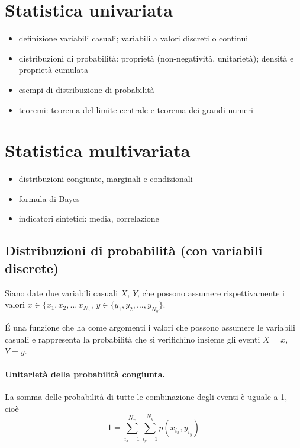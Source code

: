 
\section{Statistica univariata}
% 

\begin{itemize}
  \item definizione variabili casuali; variabili a valori discreti o continui
  \item distribuzioni di probabilità: proprietà (non-negatività, unitarietà); densità e proprietà cumulata
  \item esempi di distribuzione di probabilità
  \item teoremi: teorema del limite centrale e teorema dei grandi numeri
\end{itemize}


\section{Statistica multivariata}
% 

\begin{itemize}
  \item distribuzioni congiunte, marginali e condizionali
  \item formula di Bayes
  \item indicatori sintetici: media, correlazione
\end{itemize}


\subsection{Distribuzioni di probabilità (con variabili discrete)}

Siano date due variabili casuali $X$, $Y$, che possono assumere rispettivamente i valori $x \in \{x_1, x_2,\dots\, x_{N_x}$, $y \in \{y_1, y_2,\dots, y_{N_y}\}$.

\begin{definition} 
    \'E una funzione che ha come argomenti i valori che possono assumere le variabili casuali e rappresenta la probabilità che si verifichino insieme gli eventi $X=x$, $Y=y$.
\end{definition}

\paragraph{Unitarietà della probabilità congiunta.} La somma delle probabilità di tutte le combinazione degli eventi è uguale a 1, cioè
\begin{equation}\label{eqn:joint:normalization}
    1 = \sum_{i_x = 1}^{N_x} \sum_{i_y = 1}^{N_y} p(x_{i_x}, y_{i_y})
\end{equation}

